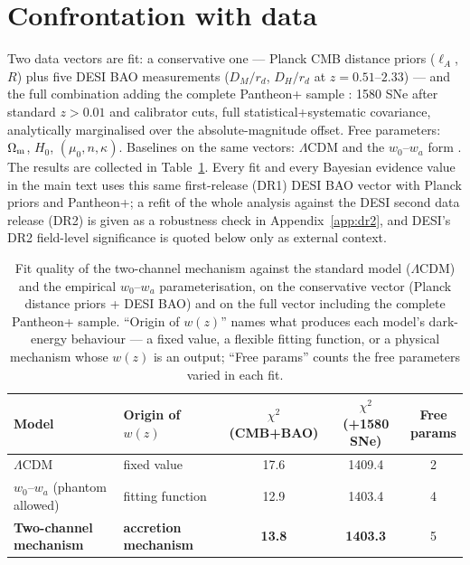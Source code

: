 \documentclass[11pt,a4paper]{article}
\newcommand{\lcdm}{\ensuremath{\Lambda}CDM}
\begin{document}
\section{Confrontation with data}\label{sec:data}

Two data vectors are fit: a conservative one --- Planck CMB distance priors ($\ell_A$, $R$) \citep{Planck2018,ChenHuangWang2019} plus five DESI BAO measurements ($D_M/r_d$, $D_H/r_d$ at $z=0.51$--$2.33$) \citep{DESI_DR1} --- and the full combination adding the complete Pantheon+ sample \citep{Brout2022,Scolnic2022}: 1580 SNe after standard $z>0.01$ and calibrator cuts, full statistical+systematic covariance, analytically marginalised over the absolute-magnitude offset. Free parameters: $\Omega_{\rm m}$, $H_0$, $(\mu_0,n,\kappa)$. Baselines on the same vectors: \lcdm{} and the $w_0$--$w_a$ form \citep{ChevallierPolarski2001,Linder2003}. The results are collected in Table~\ref{tab:fits}. Every fit and every Bayesian evidence value in the main text uses this same first-release (DR1) DESI BAO vector with Planck priors and Pantheon+; a refit of the whole analysis against the DESI second data release (DR2) is given as a robustness check in Appendix~\ref{app:dr2}, and DESI's DR2 field-level significance \citep{DESI_DR2} is quoted below only as external context.

\begin{table}[H]
\centering
\caption{Fit quality of the two-channel mechanism against the standard model (\lcdm{}) and the empirical $w_0$--$w_a$ parameterisation, on the conservative vector (Planck distance priors + DESI BAO) and on the full vector including the complete Pantheon+ sample. ``Origin of $w(z)$'' names what produces each model's dark-energy behaviour --- a fixed value, a flexible fitting function, or a physical mechanism whose $w(z)$ is an output; ``Free params'' counts the free parameters varied in each fit.}
\label{tab:fits}
\vspace{0.4em}
\setlength{\tabcolsep}{5pt}
\begin{tabular}{@{}p{3.4cm}p{2.3cm}ccc@{}}
\toprule
Model & Origin of $w(z)$ & \makecell{$\chi^2$\\(CMB+BAO)} & \makecell{$\chi^2$\\(+1580 SNe)} & \makecell{Free\\params} \\
\midrule
\lcdm{} & fixed value & 17.6 & 1409.4 & 2 \\
$w_0$--$w_a$ (phantom allowed) & fitting function & 12.9 & 1403.4 & 4 \\
\textbf{Two-channel mechanism} & \textbf{accretion mechanism} & \textbf{13.8} & \textbf{1403.3} & 5 \\
\bottomrule
\end{tabular}
\end{table}
\end{document}
